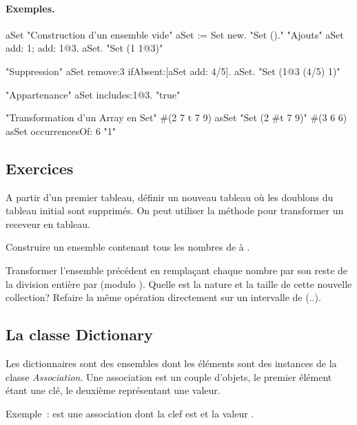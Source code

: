 \paragraph{Exemples.}

\begin{scode}
\stBar aSet \stBar
"Construction d'un ensemble vide"
aSet := Set new.                "Set ()."
"Ajouts"  
aSet add: 1; add: 1@3.
aSet.                     "Set (1 1@3)"
 
"Suppression"
aSet remove:3 ifAbsent:[aSet add: 4/5].
aSet.                     "Set (1@3 (4/5) 1)"

"Appartenance"  
aSet includes:1@3.              "true"
  
"Transformation d'un Array en Set"
\#(2 7 t 7 9) asSet              "Set (2 \#t 7 9)"
\#(3 6 6) asSet occurrencesOf: 6       "1"
\end{scode}

\subsection*{Exercices}

\begin{itemize}
\exoitem A partir d'un premier tableau, d\'efinir un nouveau tableau o\`u les doublons du tableau initial sont supprim\'es. On peut utiliser la m\'ethode  pour transformer un receveur en tableau.

\exoitem Construire un ensemble contenant tous les nombres de  \`a . 

\exoitem Transformer l'ensemble pr\'ec\'edent en rempla\c{c}ant chaque nombre par son reste de la division enti\`ere par  (modulo ). Quelle est la nature et la taille de cette nouvelle collection? Refaire la m\^eme op\'eration directement sur un intervalle de (..).

\end{itemize}

\subsection{La classe Dictionary}
Les dictionnaires sont des ensembles dont les \'el\'ements sont des instances de la classe {\it Association}. Une association est un couple d'objets, le premier \'el\'ement \'etant une cl\'e, le deuxi\`eme repr\'esentant une valeur.

Exemple~:  est une association dont la clef est  et la valeur .\\

